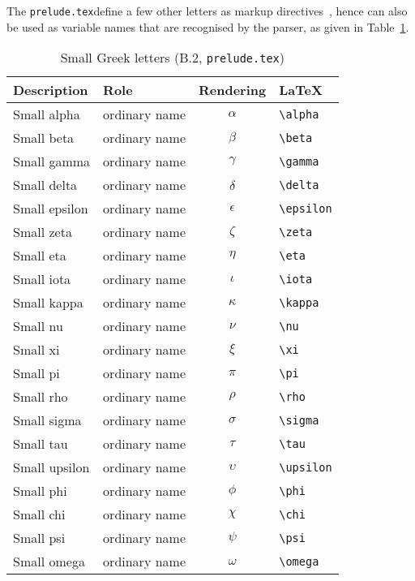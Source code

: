 \documentclass{article}
\newcommand{\emfile}[1]{\texttt{#1}}%
\newcommand{\preludefile}{\emfile{prelude.tex}}
\newcommand{\smallcaption}[1]{{\small (#1)}}
\begin{document}
The \preludefile define a few other letters as markup directives~\cite[A.2.3]{isoz},
hence can also be used as variable names that are recognised by the parser,
as given in Table~\ref{tbl:letters-greek-small}.
%
\begin{table}[ht]
\centering
\begin{tabular}{|l|l|c|l|}
   \hline
   \textbf{Description} & \textbf{Role} & \textbf{Rendering} & \textbf{\LaTeX} \\
   \hline
   Small alpha   & ordinary name & $\alpha$    & \verb|\alpha| \\
   \hline
   Small beta    & ordinary name & $\beta$     & \verb|\beta| \\
   \hline
   Small gamma   & ordinary name  & $\gamma$   & \verb|\gamma| \\
   \hline
   Small delta   & ordinary name  & $\delta$   & \verb|\delta| \\
   \hline
   Small epsilon & ordinary name & $\epsilon$  & \verb|\epsilon| \\
   \hline
   Small zeta    & ordinary name & $\zeta$      & \verb|\zeta| \\
   \hline
   Small eta     & ordinary name & $\eta$      & \verb|\eta| \\
   \hline
   Small iota    & ordinary name & $\iota$      & \verb|\iota| \\
   \hline
   Small kappa   & ordinary name & $\kappa$      & \verb|\kappa| \\
   \hline
   Small nu      & ordinary name & $\nu$      & \verb|\nu| \\
   \hline
   Small xi      & ordinary name & $\xi$      & \verb|\xi| \\
   \hline
   Small pi      & ordinary name & $\pi$      & \verb|\pi| \\
   \hline
   Small rho     & ordinary name & $\rho$      & \verb|\rho| \\
   \hline
   Small sigma   & ordinary name & $\sigma$      & \verb|\sigma| \\
   \hline
   Small tau     & ordinary name & $\tau$      & \verb|\tau| \\
   \hline
   Small upsilon & ordinary name & $\upsilon$      & \verb|\upsilon| \\
   \hline
   Small phi     & ordinary name & $\phi$      & \verb|\phi| \\
   \hline
   Small chi     & ordinary name & $\chi$      & \verb|\chi| \\
   \hline
   Small psi     & ordinary name & $\psi$      & \verb|\psi| \\
   \hline
   Small omega   & ordinary name & $\omega$      & \verb|\omega| \\
   \hline
\end{tabular}
\caption{Small Greek letters \smallcaption{B.2, \preludefile}}\label{tbl:letters-greek-small}
\end{table}
\end{document}
